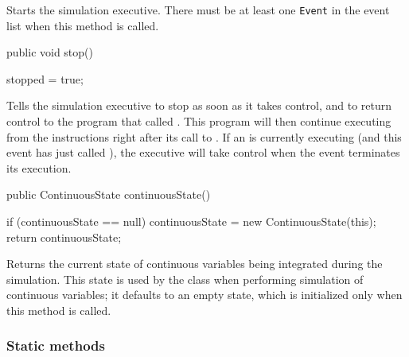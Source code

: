   \begin{tabb}  Starts the simulation executive.
   There must be at least one \texttt{Event} in the
   event list when this method is called.
  \end{tabb}
\begin{code}

   public void stop() \begin{hide}
   {
      stopped = true;
   }\end{hide}
\end{code}
  \begin{tabb} Tells the simulation executive to stop as soon as it takes control,
   and to return control to the program that called .
   This program will then continue executing from the instructions right after
   its call to . If an  is currently executing (and
   this event has just called ), the executive will take
   control when the event terminates its execution.
  \end{tabb}
\begin{code}

   public ContinuousState continuousState() \begin{hide}
   {
      if (continuousState == null)
         continuousState = new ContinuousState(this);
      return continuousState;
   }\end{hide}
\end{code}
  \begin{tabb} Returns the current state of continuous variables being
    integrated during the simulation.
    This state is used by the  class when performing
    simulation of continuous variables; it defaults to an empty state,
    which is initialized only when this method is called.
  \end{tabb}
  \begin{htmlonly}
  \end{htmlonly}
\subsubsection* {Static methods}

